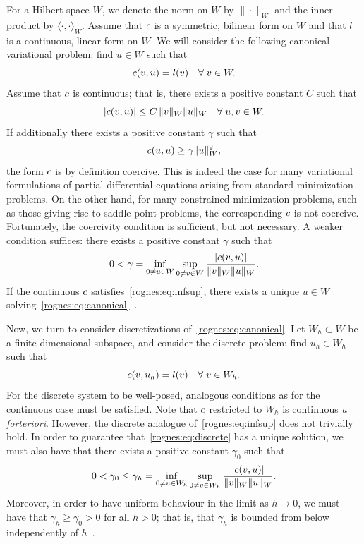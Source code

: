 For a Hilbert space $W$, we denote the norm on $W$ by
$\|\cdot\|_{W}$ and the inner product by $\langle \cdot, \cdot
\rangle_{W}$. Assume that $c$ is a symmetric, bilinear
form on $W$ and that $l$ is a continuous, linear form on
$W$. We will consider the following canonical variational
problem: find $u \in W$ such that
\begin{equation}
  \label{rognes:eq:canonical}
  c(v, u) = l(v) \quad \forall \; v \in W.
\end{equation}
Assume that $c$ is continuous; that is, there exists a positive
constant $C$ such that
\begin{equation*}
  |c(v, u)| \leq C \, \|v\|_{W} \|u\|_{W}
  \quad \forall \; u, v \in W.
\end{equation*}
If additionally there exists a positive constant $\gamma$ such that
\begin{equation*}
  c(u, u) \geq \gamma \|u\|_{W}^2,
\end{equation*}
the form $c$ is by definition coercive. This is indeed the case
for many variational formulations of partial differential equations
arising from standard minimization problems. On the other hand, for
many constrained minimization problems, such as those giving rise to
saddle point problems, the corresponding $c$ is not coercive.
Fortunately, the coercivity condition is sufficient, but not
necessary. A weaker condition suffices: there exists a positive
constant $\gamma$ such that
\begin{equation}
  \label{rognes:eq:infsup}
  0 < \gamma = \inf_{0 \not = u \in W} \sup_{0 \not = v \in W}
  \frac{|c(v,  u)|}{\|v\|_{W}\|u\|_{W}}.
\end{equation}
If the continuous $c$ satisfies~\eqref{rognes:eq:infsup}, there
exists a unique $u \in W$
solving~\eqref{rognes:eq:canonical}~\cite{Babuvska1972/73}.

Now, we turn to consider discretizations
of~\eqref{rognes:eq:canonical}. Let $W_h \subset W$ be a
finite dimensional subspace, and consider the discrete problem: find
$u_h \in W_h$ such that
\begin{equation}
  \label{rognes:eq:discrete}
  c(v, u_h) = l(v) \quad \forall \; v \in W_h.
\end{equation}
For the discrete system to be well-posed, analogous conditions as for
the continuous case must be satisfied. Note that $c$ restricted
to $W_h$ is continuous \emph{a forteriori}. However, the discrete
analogue of~\eqref{rognes:eq:infsup} does not trivially hold. In order
to guarantee that~\eqref{rognes:eq:discrete} has a unique solution, we
must also have that there exists a positive constant $\gamma_0$ such
that
\begin{equation}
  \label{rognes:eq:infsup:discrete}
  0 < \gamma_0 \leq \gamma_h = \inf_{0 \not = u \in W_h} \sup_{0
    \not = v \in W_h} \frac{|c(v, u)|}{\|v\|_{W}\|u\|_{W}}.
\end{equation}
Moreover, in order to have uniform behaviour in the limit as $h
\rightarrow 0$, we must have that $\gamma_h \geq \gamma_0 > 0$ for all
$h > 0$; that is, that $\gamma_h$ is bounded from below independently
of $h$~\cite{Babuvska1972/73}.

